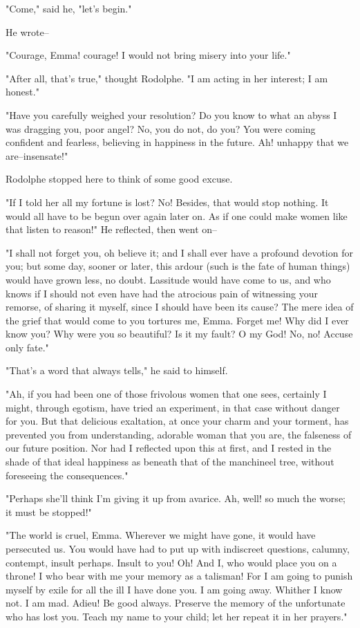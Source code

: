 \documentclass{tufte-book}
\begin{document}
"Come," said he, "let's begin."

He wrote--

"Courage, Emma! courage! I would not bring misery into your life."

"After all, that's true," thought Rodolphe. "I am acting in her
interest; I am honest."

"Have you carefully weighed your resolution? Do you know to what an
abyss I was dragging you, poor angel? No, you do not, do you? You were
coming confident and fearless, believing in happiness in the future. Ah!
unhappy that we are--insensate!"

Rodolphe stopped here to think of some good excuse.

"If I told her all my fortune is lost? No! Besides, that would stop
nothing. It would all have to be begun over again later on. As if one
could make women like that listen to reason!" He reflected, then went
on--

"I shall not forget you, oh believe it; and I shall ever have a profound
devotion for you; but some day, sooner or later, this ardour (such is
the fate of human things) would have grown less, no doubt. Lassitude
would have come to us, and who knows if I should not even have had the
atrocious pain of witnessing your remorse, of sharing it myself, since
I should have been its cause? The mere idea of the grief that would come
to you tortures me, Emma. Forget me! Why did I ever know you? Why were
you so beautiful? Is it my fault? O my God! No, no! Accuse only fate."

"That's a word that always tells," he said to himself.

"Ah, if you had been one of those frivolous women that one sees,
certainly I might, through egotism, have tried an experiment, in that
case without danger for you. But that delicious exaltation, at once your
charm and your torment, has prevented you from understanding, adorable
woman that you are, the falseness of our future position. Nor had I
reflected upon this at first, and I rested in the shade of that ideal
happiness as beneath that of the manchineel tree, without foreseeing the
consequences."

"Perhaps she'll think I'm giving it up from avarice. Ah, well! so much
the worse; it must be stopped!"

"The world is cruel, Emma. Wherever we might have gone, it would have
persecuted us. You would have had to put up with indiscreet questions,
calumny, contempt, insult perhaps. Insult to you! Oh! And I, who would
place you on a throne! I who bear with me your memory as a talisman! For
I am going to punish myself by exile for all the ill I have done you.
I am going away. Whither I know not. I am mad. Adieu! Be good always.
Preserve the memory of the unfortunate who has lost you. Teach my name
to your child; let her repeat it in her prayers."
\end{document}
